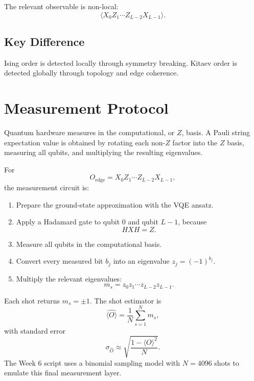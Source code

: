 \documentclass[11pt]{article}
\begin{document}
The relevant observable is non-local:
\begin{equation}
  \langle X_0 Z_1 \cdots Z_{L-2} X_{L-1} \rangle.
\end{equation}

\subsection*{Key Difference}
Ising order is detected locally through symmetry breaking.  
Kitaev order is detected globally through topology and edge coherence.

\section{Measurement Protocol}

Quantum hardware measures in the computational, or $Z$, basis. A Pauli string expectation value is obtained by rotating each non-$Z$ factor into the $Z$ basis, measuring all qubits, and multiplying the resulting eigenvalues.

For
\begin{equation}
  O_{\mathrm{edge}}=X_0 Z_1\cdots Z_{L-2}X_{L-1},
\end{equation}
the measurement circuit is:
\begin{enumerate}
  \item Prepare the ground-state approximation with the VQE ansatz.
  \item Apply a Hadamard gate to qubit $0$ and qubit $L-1$, because
  \begin{equation}
    H X H = Z.
  \end{equation}
  \item Measure all qubits in the computational basis.
  \item Convert every measured bit $b_j$ into an eigenvalue $z_j=(-1)^{b_j}$.
  \item Multiply the relevant eigenvalues:
  \begin{equation}
    m_s = z_0 z_1\cdots z_{L-2}z_{L-1}.
  \end{equation}
\end{enumerate}
Each shot returns $m_s=\pm 1$. The shot estimator is
\begin{equation}
  \widehat{\langle O\rangle}
  = \frac{1}{N}\sum_{s=1}^{N} m_s,
\end{equation}
with standard error
\begin{equation}
  \sigma_{\widehat{O}}
  \approx \sqrt{\frac{1-\langle O\rangle^2}{N}}.
\end{equation}
The Week 6 script uses a binomial sampling model with $N=4096$ shots to emulate this final measurement layer.
\end{document}
